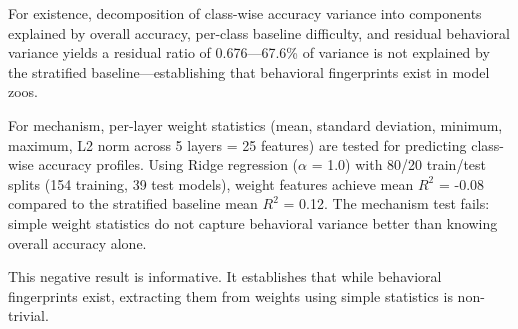 For existence, decomposition of class-wise accuracy variance into components explained by overall accuracy, per-class baseline difficulty, and residual behavioral variance yields a residual ratio of 0.676---67.6\% of variance is not explained by the stratified baseline---establishing that behavioral fingerprints exist in model zoos.

For mechanism, per-layer weight statistics (mean, standard deviation, minimum, maximum, L2 norm across 5 layers = 25 features) are tested for predicting class-wise accuracy profiles. Using Ridge regression ($\alpha$ = 1.0) with 80/20 train/test splits (154 training, 39 test models), weight features achieve mean $R^2$ = -0.08 compared to the stratified baseline mean $R^2$ = 0.12. The mechanism test fails: simple weight statistics do not capture behavioral variance better than knowing overall accuracy alone.

This negative result is informative. It establishes that while behavioral fingerprints exist, extracting them from weights using simple statistics is non-trivial.
